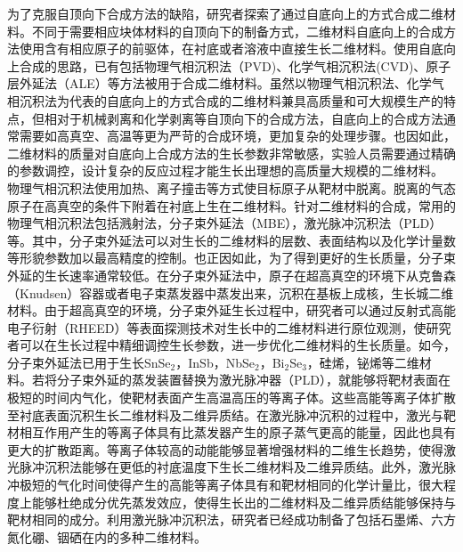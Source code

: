 为了克服自顶向下合成方法的缺陷，研究者探索了通过自底向上的方式合成二维材料。不同于需要相应块体材料的自顶向下的制备方式，二维材料自底向上的合成方法使用含有相应原子的前驱体，在衬底或者溶液中直接生长二维材料。使用自底向上合成的思路，已有包括物理气相沉积法（PVD)、化学气相沉积法(CVD)、原子层外延法（ALE）等方法被用于合成二维材料。虽然以物理气相沉积法、化学气相沉积法为代表的自底向上的方式合成的二维材料兼具高质量和可大规模生产的特点，但相对于机械剥离和化学剥离等自顶向下的合成方法，自底向上的合成方法通常需要如高真空、高温等更为严苛的合成环境，更加复杂的处理步骤。也因如此，二维材料的质量对自底向上合成方法的生长参数非常敏感，实验人员需要通过精确的参数调控，设计复杂的反应过程才能生长出理想的高质量大规模的二维材料。
物理气相沉积法使用加热、离子撞击等方式使目标原子从靶材中脱离。脱离的气态原子在高真空的条件下附着在衬底上生在二维材料。针对二维材料的合成，常用的物理气相沉积法包括溅射法，分子束外延法（MBE），激光脉冲沉积法（PLD）等。其中，分子束外延法可以对生长的二维材料的层数、表面结构以及化学计量数等形貌参数加以最高精度的控制。也正因如此，为了得到更好的生长质量，分子束外延的生长速率通常较低。在分子束外延法中，原子在超高真空的环境下从克鲁森（Knudsen）容器或者电子束蒸发器中蒸发出来，沉积在基板上成核，生长城二维材料。由于超高真空的环境，分子束外延生长过程中，研究者可以通过反射式高能电子衍射（RHEED）等表面探测技术对生长中的二维材料进行原位观测，使研究者可以在生长过程中精细调控生长参数，进一步优化二维材料的生长质量。如今，分子束外延法已用于生长SnSe$_2$，InSb，NbSe$_2$，Bi$_2$Se$_3$，硅烯，铋烯等二维材料。若将分子束外延的蒸发装置替换为激光脉冲器（PLD），就能够将靶材表面在极短的时间内气化，使靶材表面产生高温高压的等离子体。这些高能等离子体扩散至衬底表面沉积生长二维材料及二维异质结。在激光脉冲沉积的过程中，激光与靶材相互作用产生的等离子体具有比蒸发器产生的原子蒸气更高的能量，因此也具有更大的扩散距离。等离子体较高的动能能够显著增强材料的二维生长趋势，使得激光脉冲沉积法能够在更低的衬底温度下生长二维材料及二维异质结。此外，激光脉冲极短的气化时间使得产生的高能等离子体具有和靶材相同的化学计量比，很大程度上能够杜绝成分优先蒸发效应，使得生长出的二维材料及二维异质结能够保持与靶材相同的成分。利用激光脉冲沉积法，研究者已经成功制备了包括石墨烯、六方氮化硼、铟硒在内的多种二维材料。%


